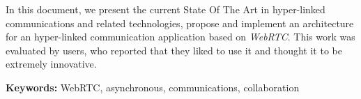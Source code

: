 In this document, we present the current State Of The Art in hyper-linked communications and related technologies, propose and implement an architecture for an hyper-linked communication application based on \emph{WebRTC}. This work was evaluated by users, who reported that they liked to use it and thought it to be extremely innovative. 


\vspace{1cm}

\textbf{\Large Keywords:} WebRTC, asynchronous, communications, collaboration


\cleardoublepage
